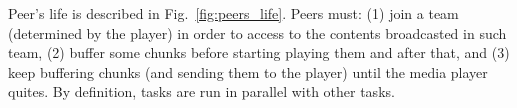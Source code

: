 \label{sec:peers_life}

\begin{figure*}
   \caption{Main actions carried out by a
    peer.\label{fig:peers_life}}
\end{figure*}

Peer's life is described in Fig.~\ref{fig:peers_life}. Peers must: (1)
join a team (determined by the player) in order to access to the
contents broadcasted in such team, (2) buffer some chunks before
starting playing them and after that, and (3) keep buffering chunks
(and sending them to the player) until the media player quites. By
definition, tasks are run in parallel with other tasks.
